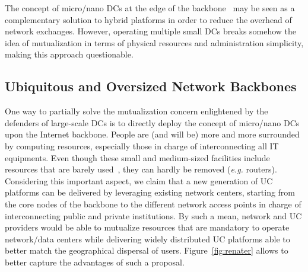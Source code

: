 \documentclass[11pt,a4paper,twoside]{article}
\begin{document}
The concept of micro/nano DCs at the edge of the backbone~\cite{greenberg:sigcomm09} may
be seen as a complementary solution to hybrid platforms in order to reduce the overhead of
network exchanges. However, operating multiple small DCs breaks somehow the idea of
mutualization in terms of physical resources and administration simplicity, making this
approach questionable.

\subsection{Ubiquitous and Oversized Network Backbones}

One way to partially solve the mutualization concern enlightened by the defenders of
large-scale DCs is to directly deploy the concept of micro/nano DCs upon the Internet
backbone. People are (and will be) more and more surrounded by computing resources,
especially those in charge of interconnecting all IT equipments. Even though these small
and medium-sized facilities include resources that are barely
used~\cite{Andrew:2003,Benson:2010}, they can hardly be removed (\textit{e.g.} routers).
Considering this important aspect, we claim that a new generation of UC platforms can be
delivered by leveraging existing network centers, starting from the core nodes of the
backbone to the different network access points in charge of interconnecting public and
private institutions. By such a mean, network and UC providers would be able to mutualize
resources that are mandatory to operate network/data centers while delivering widely
distributed UC platforms able to better match the geographical dispersal of users.
%
%
Figure~\ref{fig:renater} allows to better capture the advantages of such a proposal.
\end{document}
